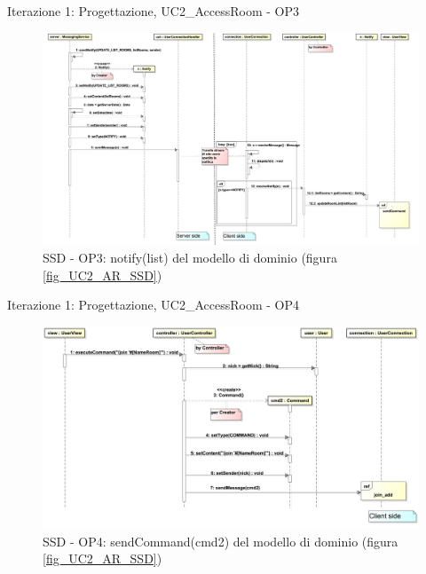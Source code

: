 \begin{frame} {Iterazione 1: Progettazione, UC2\_AccessRoom - OP3}
   \begin{figure}
     \includegraphics[scale=0.12]{image_astah/Iteration_1_DesignModel/UC2_AccessRoom_SSD_3_notify.png}{\centering}
     \caption{SSD - OP3: notify(list) del modello di dominio (figura \ref{fig_UC2_AR_SSD})}
     \label{fig_UC2_SSD_AC_3} 
   \end{figure}
\end{frame}

\begin{frame} {Iterazione 1: Progettazione, UC2\_AccessRoom - OP4}
   \begin{figure}
     \includegraphics[scale=0.18]{image_astah/Iteration_1_DesignModel/UC2_AccessRoom_SSD_4_sendCommand.png}{\centering}
     \caption{SSD - OP4: sendCommand(cmd2) del modello di dominio (figura \ref{fig_UC2_AR_SSD}) }
     \label{fig_UC2_SSD_AC_4} 
   \end{figure}
\end{frame}

